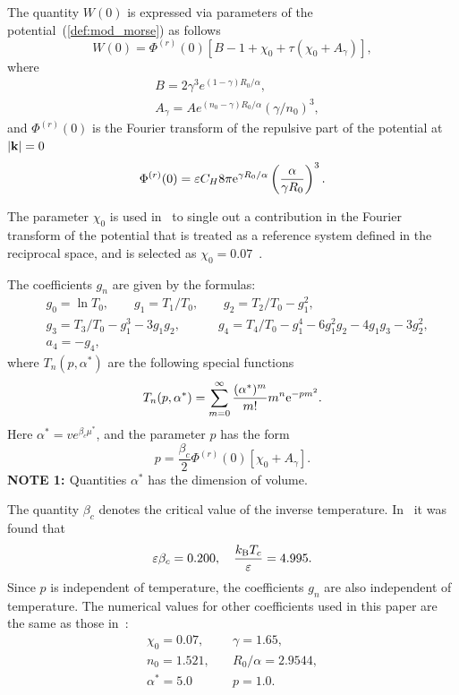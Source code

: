 \documentclass[12pt]{article}
\begin{document}
	The quantity $W(0)$ is expressed via parameters of the potential~(\ref{def:mod_morse}) as follows
	\begin{equation}
	W(0) = \Phi^{(r)}(0) \left[ B - 1 + \chi_0 + \tau (\chi_0 + A_\gamma) \right],
	\end{equation}
	where
	\begin{align*} 
		& B = 2 \gamma^3 e^{(1-\gamma)R_0/\alpha},
		\nonumber \\
		& A_\gamma = A e^{(n_0-\gamma)R_0/\alpha} \left( \gamma / n_0\right)^3, 
	\end{align*}
	and $\Phi^{(r)}(0)$ is the Fourier transform of the repulsive part of the potential at $\abs{\vb k}=0$
	\begin{equation*}
		\Phi^{(r)}(0) = \varepsilon C_H 8\pi {\rm e}^{\gamma R_0/\alpha} \left(\frac{\alpha}{\gamma R_0}\right)^3.
	\end{equation*}
	
	The parameter $\chi_0$ is used in~\cite{KozlovskiiDobush2020} to single out a contribution in the Fourier transform of the potential that is treated as a reference system defined in the reciprocal space, and is selected as $\chi_0 = 0.07$~\cite[see Eq.(24)]{KozlovskiiDobush2020}.
	
	The coefficients $g_n$ are given by the formulas:
	\begin{align}
		& g_0 = \ln T_0, \qquad g_1 = T_1/T_0, \qquad g_2 = T_2/T_0 - g_1^2,  \nonumber \\
		& g_3 = T_3/T_0 - g_1^3 - 3g_1 g_2, \quad \qquad  g_4 = T_4/T_0 - g_1^4 - 6 g_1^2 g_2 - 4 g_1 g_3 - 3 g_2^2, \nonumber\\
		& a_4 = -g_4,
	\end{align}
	where $T_n(p,\alpha^*)$ are the following special functions
	\begin{equation}
		T_n(p,\alpha^*) = \sum_{m=0}^{\infty} \frac{(\alpha^*)^m}{m!} m^n {\rm e}^{-pm^2}.
	\end{equation}
	Here $\alpha^*=v e^{\beta_c\mu^*}$, and the parameter $p$ has the form
	\begin{equation}
		p = \frac{\beta_c}{2} \Phi^{(r)}(0) [\chi_0 + A_\gamma].
	\end{equation} 
	{\color{Red} {\bf{NOTE 1: }} Quantities $\alpha^*$ has the dimension of volume.}
	
	The quantity $\beta_c$ denotes the critical value of the inverse temperature. In~\cite[see Eq.(31)]{KozlovskiiDobush2020} it was found that
	\begin{equation*}
		\varepsilon\beta_c = 0.200, \quad \frac{k_{\rm B} T_c}{\varepsilon} = 4.995.
	\end{equation*}
	Since $p$ is independent of temperature, the coefficients $g_n$ are also independent of temperature. The numerical values for other coefficients used in this paper are the same as those in~\cite[see Eqs.(5), (23), and (24)]{KozlovskiiDobush2020}:
	\begin{eqnarray}
		\label{params}
		\chi_0 = 0.07, & \quad \gamma = 1.65, \nonumber\\
		n_0 = 1.521, & \quad R_0/\alpha = 2.9544, \nonumber\\
		\alpha^* = 5.0 & \quad p = 1.0.
	\end{eqnarray}
	
\end{document}
